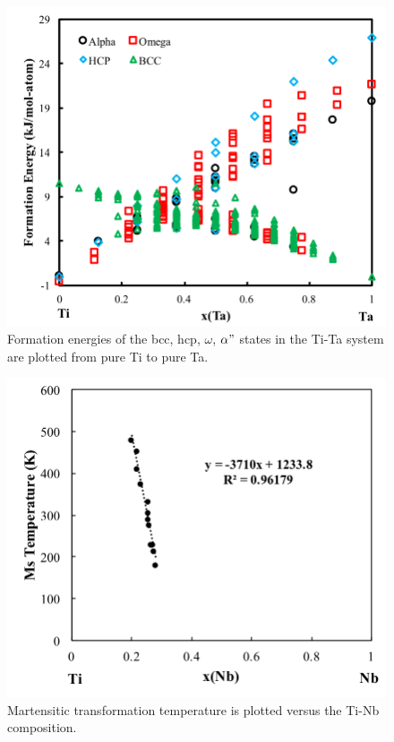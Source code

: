 \pagebreak
\begin{figure}[H]
	\centering
	\includegraphics[width=\textwidth]{Chapter-7/Figures/tita0k.png}
	\caption{Formation energies of the bcc, hcp, $\omega$, $\alpha"$ states in the Ti-Ta system are plotted from pure Ti to pure Ta.}
	\label{Ch7-figure:titab0K}
\end{figure}

\pagebreak
\begin{figure}[H]
	\centering
	\includegraphics[width=\textwidth]{Chapter-7/Figures/tinbms.png}
	\caption{Martensitic transformation temperature is plotted versus the Ti-Nb composition.}
	\label{Ch7-figure:titnbms}
\end{figure}


